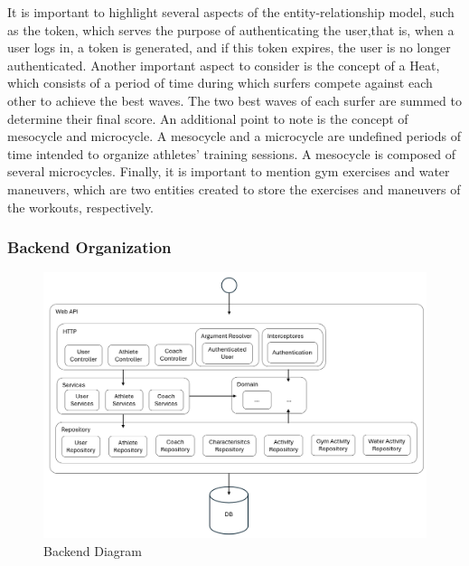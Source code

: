 \documentclass[a4paper,twoside,11pt]{article}
\begin{document}
It is important to highlight several aspects of the entity-relationship model, such as the token, which serves the purpose of authenticating the user,that is, when a user logs in, a token is generated, and if this token expires, the user is no longer authenticated.
Another important aspect to consider is the concept of a Heat, which consists of a period of time during which surfers compete against each other to achieve the best waves. The two best waves of each surfer are summed to determine their final score.
An additional point to note is the concept of mesocycle and microcycle. A mesocycle and a microcycle are undefined periods of time intended to organize athletes' training sessions. A mesocycle is composed of several microcycles.
Finally, it is important to mention gym exercises and water maneuvers, which are two entities created to store the exercises and maneuvers of the workouts, respectively.

\subsubsection{Backend Organization}
\begin{figure}[H]
\centering
\includegraphics[width=6in]{BackendDiagram.png}
\caption{Backend Diagram}
\end{figure}
\end{document}
